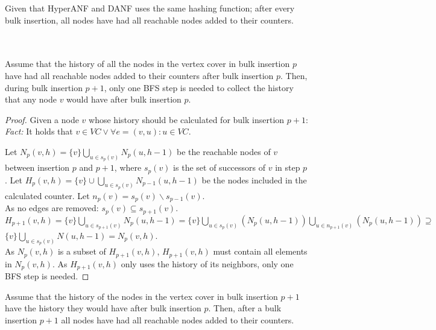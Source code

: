 \begin{theorem} Given that HyperANF and DANF uses the same hashing function; after every bulk insertion, all nodes have had all reachable nodes added to their counters. \\\\
\\

\begin{lemma} Assume that the history of all the nodes in the vertex cover in bulk insertion $p$ have had all reachable nodes added to their counters after bulk insertion $p$. Then, during bulk insertion $p+1$, only one BFS step is needed to collect the history that any node $v$ would have after bulk insertion $p$. \\\label{lemma:partial_history_calculation}

\begin{proof} Given a node $v$ whose history should be calculated for bulk insertion $p+1$:\\

\noindent\textit{Fact:} It holds that $v \in VC \vee \forall e = (v,u) : u \in VC$.

\noindent Let $N_p(v,h) = \{v\}\bigcup\limits_{u \in s_p(v)} N_p(u,h-1) $ be the reachable nodes of $v$ between insertion $p$ and $p+1$, where $s_p(v)$ is the set of successors of $v$ in step $p$. Let $H_p(v,h) = \{v\}\cup\bigcup\limits_{u\in s_{p}(v)}N_{p-1}(u,h-1)$ be the nodes included in the calculated counter. Let $n_p(v)=s_p(v)\backslash s_{p-1}(v)$.\\


\noindent As no edges are removed: 
$s_p(v) \subseteq s_{p+1}(v)$.\\ 
$H_{p+1}(v,h) = \{v\}\bigcup\limits_{u\in s_{p+1}(v)}N_{p}(u,h-1) = \{v\}\bigcup\limits_{u\in s_{p}(v)}(N_{p}(u,h-1)) \bigcup\limits_{u\in n_{p+1}(v)}(N_{p}(u,h-1)) \supseteq $\\ $\{v\}\bigcup\limits_{u \in s_p(v)} N(u,h-1) = N_p(v,h)$. \\

\noindent As $N_p(v,h)$ is a subset of $H_{p+1}(v,h)$, $H_{p+1}(v,h)$ must contain all elements in $N_p(v,h)$. As $H_{p+1}(v,h)$ only uses the history of its neighbors, only one BFS step is needed. 

\end{proof} 
\end{lemma}

\begin{lemma} Assume that the history of the nodes in the vertex cover in bulk insertion $p+1$ have the history they would have after bulk insertion $p$. Then, after a bulk insertion $p+1$ all nodes have had all reachable nodes added to their counters.\\
\label{lemma:propagation}


\end{lemma}
\end{theorem}
